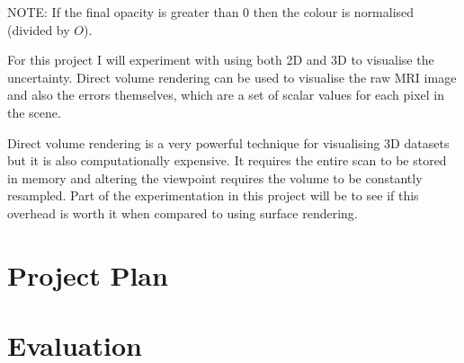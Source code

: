 \documentclass[
  oneside,
  11pt, a4paper,
  footinclude=true,
  headinclude=true,
  cleardoublepage=empty
]{scrbook}
\begin{document}
NOTE: If the final opacity is greater than 0 then the colour is normalised (divided by $O$).

For this project I will experiment with using both 2D and 3D to visualise the uncertainty. Direct volume rendering can be used to visualise the raw MRI image and also the errors themselves, which are a set of scalar values for each pixel in the scene.

Direct volume rendering is a very powerful technique for visualising 3D datasets but it is also computationally expensive. It requires the entire scan to be stored in memory and altering the viewpoint requires the volume to be constantly resampled. Part of the experimentation in this project will be to see if this overhead is worth it when compared to using surface rendering.

\chapter{Project Plan}

\chapter{Evaluation}

 

    
\end{document}
